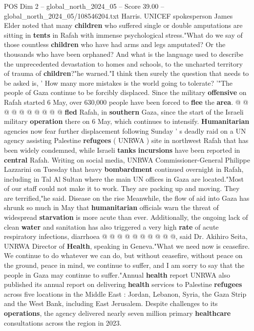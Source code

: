 \begin{textsample}{POS Dim 2 – global\_north\_2024\_05 – Score 39.00 – global\_north\_2024\_05/108546204.txt}
Harris.
UNICEF spokesperson James Elder noted that many \textbf{children} who suffered single or double amputations are sitting in \textbf{tents} in Rafah with immense psychological stress."What do we say of those countless \textbf{children} who have had arms and legs amputated?
Or the thousands who have been orphaned?
And what is the language used to describe the unprecedented devastation to homes and schools, to the uncharted territory of trauma of \textbf{children}?"he warned."I think then surely the question that needs to be asked is, ' How many more mistakes is the world going to tolerate? '"The people of Gaza continue to be forcibly displaced.
Since the military \textbf{offensive} on Rafah started 6 May, over 630,000 people have been forced to \textbf{flee} the \textbf{area}. @ @ @ @ @ @ @ @ @ @ \textbf{fled} Rafah, in \textbf{southern} Gaza, since the start of the Israeli military \textbf{operation} there on 6 May, which continues to intensify. \textbf{Humanitarian} agencies now fear further displacement following Sunday ' s deadly raid on a UN agency assisting Palestine \textbf{refugees} ( UNRWA ) site in northwest Rafah that has been widely condemned, while Israeli \textbf{tanks} \textbf{incursions} have been reported in \textbf{central} Rafah.
Writing on social media, UNRWA Commissioner-General Philippe Lazzarini on Tuesday that heavy \textbf{bombardment} continued overnight in Rafah, including in Tal Al Sultan where the main UN offices in Gaza are located."Most of our staff could not make it to work.
They are packing up and moving.
They are terrified,"he said.
Disease on the rise Meanwhile, the flow of aid into Gaza has shrunk so much in May that \textbf{humanitarian} officials warn the threat of widespread \textbf{starvation} is more acute than ever.
Additionally, the ongoing lack of clean \textbf{water} and sanitation has also triggered a very high \textbf{rate} of acute respiratory infections, diarrhoea @ @ @ @ @ @ @ @ @ @, said Dr.
Akihiro Seita, UNRWA Director of \textbf{Health}, speaking in Geneva."What we need now is ceasefire.
We continue to do whatever we can do, but without ceasefire, without peace on the ground, peace in mind, we continue to suffer, and I am sorry to say that the people in Gaza may continue to suffer."Annual \textbf{health} report UNRWA also published its annual report on delivering \textbf{health} services to Palestine \textbf{refugees} across five locations in the Middle East : Jordan, Lebanon, Syria, the Gaza Strip and the West Bank, including East Jerusalem.
Despite challenges to its \textbf{operations}, the agency delivered nearly seven million primary \textbf{healthcare} consultations across the region in 2023.

\end{textsample}
